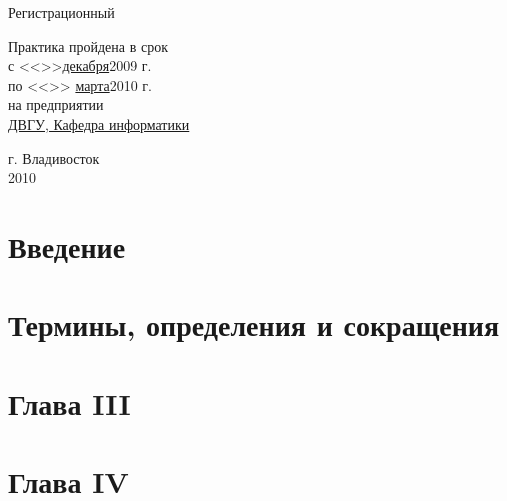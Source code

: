 \documentclass[a4paper,14pt,russian]{article}
\begin{document}
\begin{titlepage}
\begin{minipage}{0.4\textwidth}
\begin{flushleft}
Регистрационный \No \underline{}\\
\underline{}
\end{flushleft}
\end{minipage}

\begin{minipage}{0.5\textwidth}
\begin{flushleft}
Практика пройдена в срок\\
с <<>>\underline{декабря}2009 г.\\
по <<>> \underline{марта}2010 г.\\
на предприятии \underline{}\\
\underline{ДВГУ, Кафедра информатики}
\end{flushleft}
\end{minipage}

\vfill %

\begin{center}
г. Владивосток\\
2010\\
\end{center}

\thispagestyle{empty} %
\end{titlepage} %

\tableofcontents %

\newpage
\section{Введение}
\section{Термины, определения и сокращения}
\section{Глава III}
\section{Глава IV}
\end{document}
